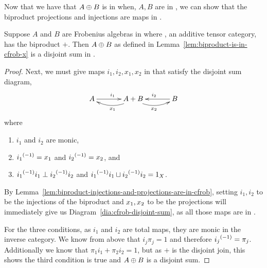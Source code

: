 Now that we have that $A\oplus B$ is in \CFrob when, $A,B$ are in \CFrob, we can show that the
biproduct projections and injections are maps in \CFrob.


\begin{proposition}\label{prop:cfrobx_has_disjoint_sums}
  Suppose $A$ and $B$ are Frobenius algebras in \CFrob where \X, an additive tensor category, has
  the biproduct $+$.
  Then $A\oplus B$ as defined in Lemma~\ref{lem:biproduct-is-in-cfrob-x} is a disjoint sum in \CFrob.
\end{proposition}
\begin{proof}
  Next, we must give maps $i_1,i_2,x_1,x_2$  in \CFrob that satisfy the disjoint sum diagram,
  \begin{equation}
    \xymatrix@C+10pt{
      A\ar[r]^{i_1} &A+B\ar@/^9pt/[l]^{x_1} \ar@/_9pt/[r]_{x_2} & B \ar[l]_{i_2}
    }\label{dia:cfrob-disjoint-sum}
  \end{equation}
  where
  \begin{enumerate}[{(}i{)}]
    \item $i_1$ and $i_2$ are monic,
    \item ${i_1}^{(-1)} = x_1$ and ${i_2}^{(-1)} = x_2$, and
    \item ${i_1}^{(-1)}i_1 \perp {i_2}^{(-1)}i_2$ and ${i_1}^{(-1)}i_1 \sqcup {i_2}^{(-1)}i_2 = 1_X$.
  \end{enumerate}

  By Lemma~\ref{lem:biproduct-injections-and-projections-are-in-cfrob}, setting $i_1,i_2$ to be the
  injections of the biproduct and $x_1,x_2$ to be the projections will immediately give us
  Diagram~\ref{dia:cfrob-disjoint-sum}, as all those maps are in \CFrob.

  For the three conditions, as $i_1$ and $i_2$ are total maps, they are monic in the inverse
  category. We know from above that $i_j\pi_j = 1$ and therefore ${i_j}^{(-1)} = \pi_j$. Additionally
  we know that $\pi_1i_1 + \pi_2i_2 = 1$, but as $+$ is the disjoint join, this shows the third
  condition is true and $A\oplus B$ is a disjoint sum.
\end{proof}


